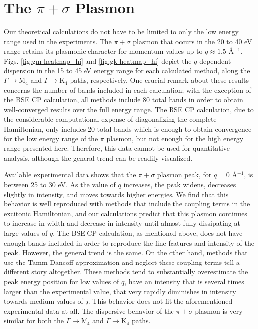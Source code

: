 \documentclass[aps,prb,10pt,superscriptaddress,notitlepage,endfloats]{revtex4-1}
\begin{document}

\section{The \texorpdfstring{$\pi + \sigma$}{pi + sigma} Plasmon}

Our theoretical calculations do not have to be limited to only the low energy
range used in the experiments. The $\pi + \sigma$ plasmon that occurs in the 20
to 40 eV range retains its plasmonic character for momentum values up to $q
\approx 1.5$ \r{A}$^{-1}$. Figs. \ref{fig:gm-heatmap_hi} and
\ref{fig:gk-heatmap_hi} depict the $q$-dependent dispersion in the 15 to 45 eV
energy range for each calculated method, along the $\Gamma \rightarrow
\mathrm{M}_{4}$ and $\Gamma \rightarrow \mathrm{K}_{4}$ paths, respectively. One
crucial remark about these results concerns the number of bands included in each
calculation; with the exception of the BSE CP calculation, all methods include
80 total bands in order to obtain well-converged results over the full energy
range. The BSE CP calculation, due to the considerable computational expense of
diagonalizing the complete Hamiltonian, only includes 20 total bands which is
enough to obtain convergence for the low energy range of the $\pi$ plasmon, but
not enough for the high energy range presented here. Therefore, this data cannot
be used for quantitative analysis, although the general trend can be readily
visualized.

Available experimental data \cite{zeppenfeldZP71, buchnerPSSB77,
marinopoulosPRB04} shows that the $\pi + \sigma$ plasmon peak, for $q = 0$
\r{A}$^{-1}$, is between 25 to 30 eV. As the value of $q$ increases, the peak
widens, decreases slightly in intensity, and moves towards higher energies. We
find that this behavior is well reproduced with methods that include the
coupling terms in the excitonic Hamiltonian, and our calculations predict that
this plasmon continues to increase in width and decrease in intensity until
almost fully dissipating at large values of $q$. The BSE CP calculation, as
mentioned above, does not have enough bands included in order to reproduce the
fine features and intensity of the peak. However, the general trend is the same.
On the other hand, methods that use the Tamm-Dancoff approximation and neglect
these coupling terms tell a different story altogether. These methods tend to
substantially overestimate the peak energy position for low values of $q$, have
an intensity that is several times larger than the experimental value, that very
rapidly diminishes in intensity towards
medium values of $q$. This behavior does not fit the aforementioned experimental
data at all. The dispersive behavior of the $\pi + \sigma$ plasmon is very
similar for both the $\Gamma \rightarrow \mathrm{M}_{4}$ and $\Gamma \rightarrow
\mathrm{K}_{4}$ paths.
\end{document}
